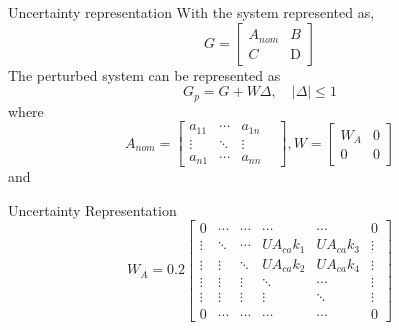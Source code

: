 
\begin{frame}{Uncertainty representation}
	With the system represented as,
		\begin{equation*}
			G = \left\lbrack \begin{array}{cc}
				A_{nom} & B\\
				C & \textrm{D}
			\end{array}\right\rbrack
		\end{equation*}
	The perturbed system can be represented as
		\begin{equation*}
			G_p = G + W\Delta, \quad |\Delta|\leq 1
		\end{equation*}
	where
		\begin{equation*} 
			A_{nom} =
			\begin{bmatrix}
				a_{11} & \cdots &  a_{1n} & \\
				\vdots & \ddots & \vdots & \\
				a_{n1} & \cdots & a_{nn} &
			\end{bmatrix}, W = \left\lbrack \begin{array}{cc}
			W_A & 0\\
			0 & 0 \end{array}\right\rbrack 
		\end{equation*}
	and
\end{frame}




\begin{frame}{Uncertainty Representation}{}
	\begin{equation*}
		W_A = 0.2\begin{bmatrix}
			0      & \cdots & \cdots & \cdots     & \cdots     & 0      \\
			\vdots & \ddots & \cdots & UA_{ca}k_1 & UA_{ca}k_3 & \vdots \\
			\vdots & \vdots & \ddots & UA_{ca}k_2 & UA_{ca}k_4 & \vdots \\
			\vdots & \vdots & \vdots & \ddots     & \cdots     & \vdots \\
			\vdots & \vdots & \vdots & \vdots     & \ddots     & \vdots \\
			0      & \cdots & \cdots & \cdots     & \cdots     & 0
		\end{bmatrix}
	\end{equation*}
	\begin{figure}[h!]
		\centering
		\resizebox{\columnwidth}{!}{
			}
		\label{fig:tikzControlStrat}
	\end{figure}
\end{frame}
